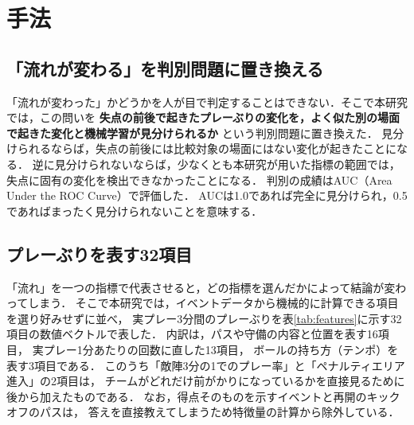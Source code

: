 \documentclass[11pt]{ujarticle} %
\begin{document}
\section{⼿法}
\label{sec:method}

\subsection{「流れが変わる」を判別問題に置き換える}

「流れが変わった」かどうかを人が目で判定することはできない．そこで本研究では，この問いを
\textbf{失点の前後で起きたプレーぶりの変化を，よく似た別の場面で起きた変化と機械学習が見分けられるか}
という判別問題に置き換えた．
見分けられるならば，失点の前後には比較対象の場面にはない変化が起きたことになる．
逆に見分けられないならば，少なくとも本研究が用いた指標の範囲では，
失点に固有の変化を検出できなかったことになる．
判別の成績はAUC（Area Under the ROC Curve）で評価した．
AUCは1.0であれば完全に見分けられ，0.5であればまったく見分けられないことを意味する．

\subsection{プレーぶりを表す32項目}

「流れ」を一つの指標で代表させると，どの指標を選んだかによって結論が変わってしまう．
そこで本研究では，イベントデータから機械的に計算できる項目を選り好みせずに並べ，
実プレー3分間のプレーぶりを表\ref{tab:features}に示す32項目の数値ベクトルで表した．
内訳は，パスや守備の内容と位置を表す16項目，
実プレー1分あたりの回数に直した13項目，
ボールの持ち方（テンポ）を表す3項目である．
このうち「敵陣3分の1でのプレー率」と「ペナルティエリア進入」の2項目は，
チームがどれだけ前がかりになっているかを直接見るために後から加えたものである．
なお，得点そのものを示すイベントと再開のキックオフのパスは，
答えを直接教えてしまうため特徴量の計算から除外している．
\end{document}
